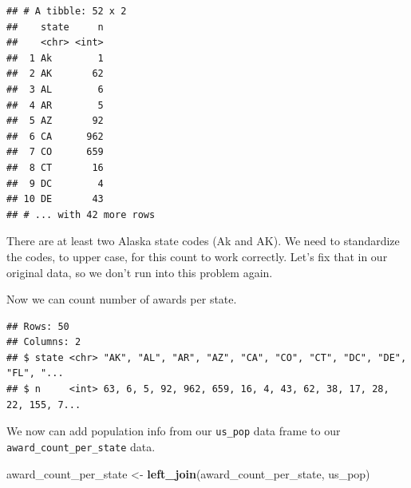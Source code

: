 \documentclass[
]{book}
\newenvironment{Shaded}{\begin{snugshade}}{\end{snugshade}}
\newcommand{\CommentTok}[1]{\textcolor[rgb]{0.56,0.35,0.01}{\textit{#1}}}
\newcommand{\DataTypeTok}[1]{\textcolor[rgb]{0.13,0.29,0.53}{#1}}
\newcommand{\KeywordTok}[1]{\textcolor[rgb]{0.13,0.29,0.53}{\textbf{#1}}}
\newcommand{\NormalTok}[1]{#1}
\newcommand{\OperatorTok}[1]{\textcolor[rgb]{0.81,0.36,0.00}{\textbf{#1}}}
\newcommand{\StringTok}[1]{\textcolor[rgb]{0.31,0.60,0.02}{#1}}
\begin{document}
\begin{verbatim}
## # A tibble: 52 x 2
##    state     n
##    <chr> <int>
##  1 Ak        1
##  2 AK       62
##  3 AL        6
##  4 AR        5
##  5 AZ       92
##  6 CA      962
##  7 CO      659
##  8 CT       16
##  9 DC        4
## 10 DE       43
## # ... with 42 more rows
\end{verbatim}

There are at least two Alaska state codes (Ak and AK). We need to standardize the codes, to upper case, for this count to work correctly. Let's fix that in our original data, so we don't run into this problem again.

\begin{Shaded}
\end{Shaded}

Now we can count number of awards per state.

\begin{Shaded}
\end{Shaded}

\begin{verbatim}
## Rows: 50
## Columns: 2
## $ state <chr> "AK", "AL", "AR", "AZ", "CA", "CO", "CT", "DC", "DE", "FL", "...
## $ n     <int> 63, 6, 5, 92, 962, 659, 16, 4, 43, 62, 38, 17, 28, 22, 155, 7...
\end{verbatim}

We now can add population info from our \texttt{us\_pop} data frame to our \texttt{award\_count\_per\_state} data.

\begin{Shaded}
\begin{Highlighting}[]
\NormalTok{award_count_per_state <-}\StringTok{ }\KeywordTok{left_join}\NormalTok{(award_count_per_state, us_pop)}
\end{Highlighting}
\end{Shaded}
\end{document}
